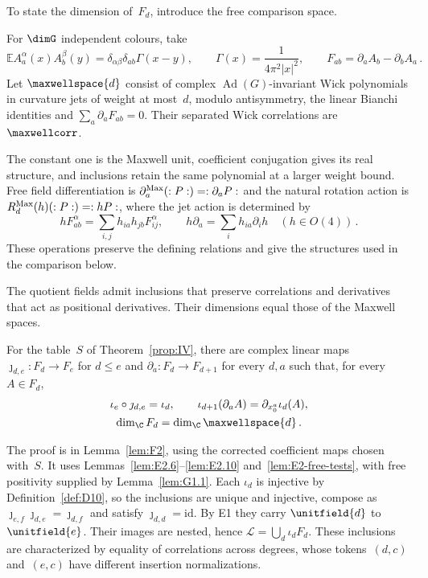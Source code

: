 To state the dimension of~$F_d$, introduce the free comparison space.
\begin{definition}\label{def:D11}
For $\dimG$ independent colours, take
\begin{equation*}
\mathbb E A_a^\alpha(x)A_b^\beta(y)
=\delta_{\alpha\beta}\delta_{ab}\Gamma(x-y),\qquad
\Gamma(x)=\frac1{4\pi^2|x|^2},\qquad F_{ab}=\partial_aA_b-\partial_bA_a\,.
\end{equation*}
Let $\maxwellspace{d}$ consist of complex $\operatorname{Ad}(G)$-invariant Wick polynomials in curvature jets of weight at most~$d$, modulo antisymmetry, the linear Bianchi identities and $\sum_a\partial_aF_{ab}=0$. Their separated Wick correlations are~$\maxwellcorr$.
\end{definition}
The constant one is the Maxwell unit, coefficient conjugation gives its real structure, and inclusions retain the same polynomial at a larger weight bound. Free field differentiation is $\partial_a^{\rm Max}(:P:)=:\partial_aP:$ and the natural rotation action is $R_d^{\rm Max}(h)(:P:)=:hP:$, where the jet action is determined by
\begin{equation*}
hF_{ab}^\alpha=\sum_{i,j}h_{ia}h_{jb}F_{ij}^\alpha,\qquad
h\partial_a=\sum_i h_{ia}\partial_i h\quad(h\in O(4))\,.
\end{equation*}
These operations preserve the defining relations and give the structures used in the comparison below.

The quotient fields admit inclusions that preserve correlations and derivatives that act as positional derivatives. Their dimensions equal those of the Maxwell spaces.
\begin{proposition}\label{prop:FC}
For the table~$S$ of Theorem~\ref{prop:IV}, there are complex linear maps $\jmath_{d,e}:F_d\to F_e$ for $d\le e$ and $\partial_a:F_d\to F_{d+1}$ for every $d,a$ such that, for every $A\in F_d$,
\begin{gather*}
\iota_e\circ\jmath_{d,e}=\iota_d,\qquad
\iota_{d+1}(\partial_aA)=\partial_{x_0^a}\iota_d(A),\\
\dim_\C F_d=\dim_\C\maxwellspace{d}\,.
\end{gather*}
\end{proposition}
The proof is in Lemma~\ref{lem:F2}, using the corrected coefficient maps chosen with~$S$. It uses Lemmas~\ref{lem:E2.6}--\ref{lem:E2.10} and~\ref{lem:E2-free-tests}, with free positivity supplied by Lemma~\ref{lem:G1.1}. Each $\iota_d$ is injective by Definition~\ref{def:D10}, so the inclusions are unique and injective, compose as $\jmath_{e,f}\jmath_{d,e}=\jmath_{d,f}$ and satisfy $\jmath_{d,d}=\mathrm{id}$. By E1 they carry $\unitfield{d}$ to~$\unitfield{e}$. Their images are nested, hence $\mathcal L=\bigcup_d\iota_dF_d$. These inclusions are characterized by equality of correlations across degrees, whose tokens~$(d,c)$ and~$(e,c)$ have different insertion normalizations.

